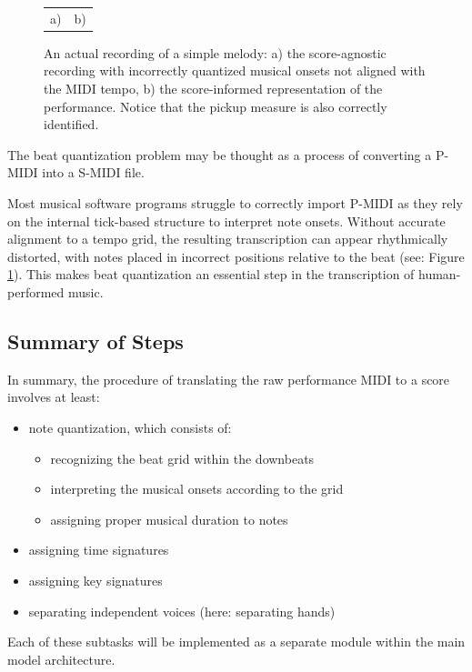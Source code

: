 \begin{figure}[ht!]
\centering
\begin{tabular}{cc}a)

 & b)
\end{tabular}
\caption[An actual recording of a simple melody]{An actual recording of a simple melody: a) the score-agnostic recording with incorrectly quantized musical onsets not aligned with the MIDI tempo, b) the score-informed representation of the performance. Notice that the pickup measure is also correctly identified.}
\label{score_informed}
\end{figure}

The beat quantization problem may be thought as a process of converting a P-MIDI into a S-MIDI file.

Most musical software programs struggle to correctly import P-MIDI as they rely on the internal tick-based structure to interpret note onsets. Without accurate alignment to a tempo grid, the resulting transcription can appear rhythmically distorted, with notes placed in incorrect positions relative to the beat (see: Figure \ref{score_informed}). This makes beat quantization an essential step in the transcription of human-performed music.

\subsection{Summary of Steps}

In summary, the procedure of translating the raw performance MIDI to a score involves at least: \begin{itemize}
	\item note quantization, which consists of:
	\begin{itemize}
		\item recognizing the beat grid within the downbeats
		\item interpreting the musical onsets according to the grid
		\item assigning proper musical duration to notes	
	\end{itemize}
	\item assigning time signatures
	\item assigning key signatures
	\item separating independent voices (here: separating hands)
\end{itemize}

Each of these subtasks will be implemented as a separate module within the main model architecture.

